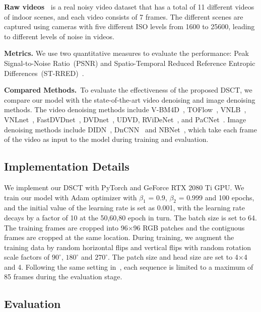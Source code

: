 \documentclass[journal]{IEEEtran}
\begin{document}
\noindent
\textbf{Raw videos~\cite{Yue_2020_CVPR}} is a real noisy video dataset that has a total of 11 different videos of indoor scenes, and each video consists of 7 frames. The different scenes are captured using cameras with five different ISO levels from 1600 to 25600, leading to different levels of noise in videos.

\noindent
\textbf{Metrics.} We use two quantitative measures to evaluate the performance: Peak Signal-to-Noise Ratio~(PSNR) and Spatio-Temporal Reduced Reference Entropic Differences~(ST-RRED)~\cite{Soundararajan2013VideoQA}.


\noindent
\textbf{Compared Methods.}~To evaluate the effectiveness of the proposed DSCT, we compare our model with the state-of-the-art video denoising and image denoising methods. The video denoising methods include V-BM4D~\cite{Maggioni2012VideoDD}, TOFlow~\cite{xue2019video}, VNLB~\cite{Arias2017VideoDV}, VNLnet~\cite{Davy2018NonLocalVD}, FastDVDnet~\cite{Tassano2020FastDVDnetTR}, DVDnet~\cite{Tassano2019DVDNETAF}, UDVD\cite{Sheth_2021_ICCV}, RViDeNet~\cite{Yue_2020_CVPR}, and PaCNet~\cite{Vaksman_2021_ICCV}. Image denoising methods include DIDN~\cite{9025411}, DnCNN~\cite{Zhang2017BeyondAG} and NBNet~\cite{Cheng2020NBNetNB}, which take each frame of the video as input to the model during training and evaluation.

\subsection{Implementation Details}  
We implement our DSCT with PyTorch \cite{paszke2019pytorch} and GeForce RTX 2080 Ti GPU. We train our model with Adam optimizer\cite{2014Adam} with $\beta_{1}$ = 0.9, $\beta_{2}$ = 0.999 and 100 epochs, and the initial value of the learning rate is set as 0.001, with the learning rate decays by a factor of 10 at the 50,60,80 epoch in turn. The batch size is set to 64. The training frames are cropped into 96$\times$96 RGB patches and the contiguous frames are cropped at the same location. During training, we augment the training data by random horizontal flips and vertical flips with random rotation scale factors of $90^{\circ}$, $180^{\circ}$ and $270^{\circ}$. The patch size and head size are set to 4$\times$4 and 4. Following the same setting in~\cite{Tassano2020FastDVDnetTR}, each sequence is limited to a maximum of 85 frames during the evaluation stage. 


\subsection{Evaluation}
\end{document}
